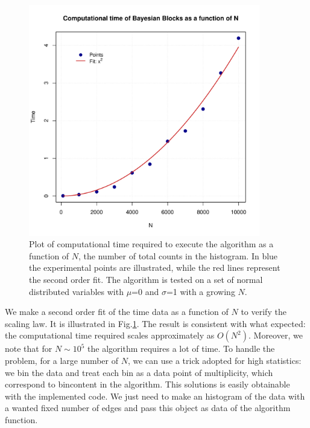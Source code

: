 \documentclass[prb,twocolumn]{revtex4-1}
\begin{document}
\begin{figure}[h!]
    \begin{minipage}[l]{1.0\columnwidth}
    \centering
    \includegraphics[width=0.9\textwidth]{images/scaling.pdf}
    \caption{Plot of computational time required to execute the algorithm as a function of $N$, the number of total counts in the histogram. In blue the experimental points are illustrated, while the red lines represent the second order fit. The algorithm is tested on a set of normal distributed variables with $\mu$=0 and $\sigma$=1 with a growing $N$.}
    \label{fig:scaling}
    \end{minipage}
\end{figure}

We make a second order fit of the time data as a function of $N$ to verify the scaling law. It is illustrated in Fig.\ref{fig:scaling}.
The result is consistent with what expected: the computational time required scales approximately as $O(N^2)$.
Moreover, we note that for $N \sim 10^{5}$ the algorithm requires a lot of time. 
To handle the problem, for a large number of $N$, we can use a trick adopted for high statistics: we bin the data and treat each bin as a data point of multiplicity, which correspond to bincontent in the algorithm.
This solutions is easily obtainable with the implemented code. 
We just need to make an histogram of the data with a wanted fixed number of edges and pass this object as data of the algorithm function.
\end{document}
